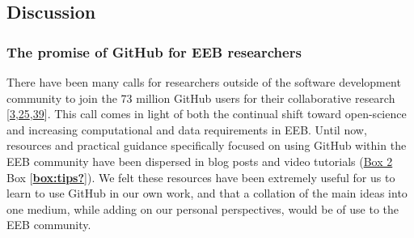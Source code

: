 \hypertarget{discussion}{%
\subsection{Discussion}\label{discussion}}

\hypertarget{the-promise-of-github-for-eeb-researchers}{%
\subsubsection{The promise of GitHub for EEB researchers}\label{the-promise-of-github-for-eeb-researchers}}

There have been many calls for researchers outside of the software development community to join the 73 million GitHub users for their collaborative research {[}\protect\hyperlink{ref-10ghgV3S8}{3},\protect\hyperlink{ref-1Du6fzB8g}{25},\protect\hyperlink{ref-UsTxAq4f}{39}{]}.
This call comes in light of both the continual shift toward open-science and increasing computational and data requirements in EEB.
Until now, resources and practical guidance specifically focused on using GitHub within the EEB community have been dispersed in blog posts and video tutorials (\protect\hyperlink{tips}{Box 2} Box {[}\protect\hyperlink{ref-box:tips}{\textbf{box:tips?}}{]}).
We felt these resources have been extremely useful for us to learn to use GitHub in our own work, and that a collation of the main ideas into one medium, while adding on our personal perspectives, would be of use to the EEB community.

